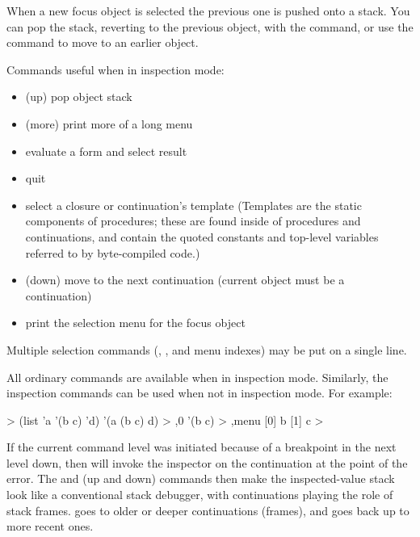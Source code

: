 When a new focus object is selected the previous one is pushed onto a
 stack.
You can pop the stack, reverting to the previous object, with
 the  command, or use the  command to move to
 an earlier object.

%

Commands useful when in inspection mode:
\begin{itemize}
\item{} (up) pop object stack
\item{} (more) print more of a long menu
\item\code{(\ldots)} evaluate a form and select result
\item{} quit
\item{} select a closure or continuation's template
 (Templates are the static components of procedures; these are found
  inside of procedures and continuations, and contain the quoted
  constants and top-level variables referred to by byte-compiled code.)
\item{} (down) move to the next continuation
 (current object must be a continuation)
\item{} print the selection menu for the focus object
\end{itemize}

Multiple selection commands (, , and menu indexes)
 may be put on a single line.


All ordinary commands are available when in inspection mode.
Similarly, the inspection commands can be used when not in inspection
 mode.
For example:
\begin{example}
> (list 'a '(b c) 'd)
'(a (b c) d)
> ,0
'(b c)
> ,menu
[0] b
[1] c
> 
\end{example}

If the current command level was initiated because of
 a breakpoint in the next level down, then 
  will invoke the inspector on the
 continuation at the point of the error.
The  and  (up and down)
commands then make the inspected-value stack look like a conventional stack
debugger, with continuations playing the role of stack frames.   goes
to older or deeper continuations (frames), and  goes back up to more
recent ones.

